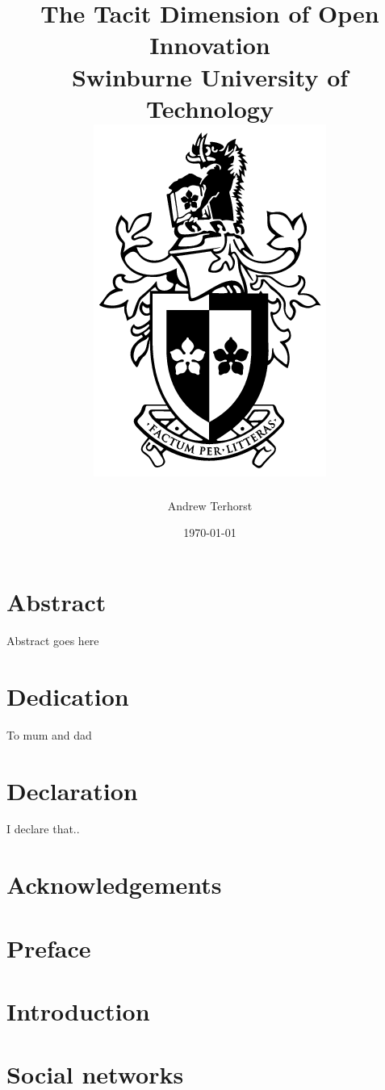 \documentclass[12pt,twoside]{report}
\title{
	{The Tacit Dimension of Open Innovation}\\
	{\large Swinburne University of Technology}\\
	{\includegraphics[width=0.3\columnwidth]{swinburne_university_of_technology.png}}
}
\author{Andrew Terhorst}
\date{\today}
\begin{document}
\onehalfspacing
\maketitle
\renewcommand{\bibname}{References}

 

\chapter*{Abstract}

Abstract goes here

\chapter*{Dedication}
To mum and dad

\chapter*{Declaration}
I declare that..


\chapter*{Acknowledgements}

\tableofcontents

\chapter*{Preface}

\chapter{Introduction}


\chapter{Social networks}

\end{document}
